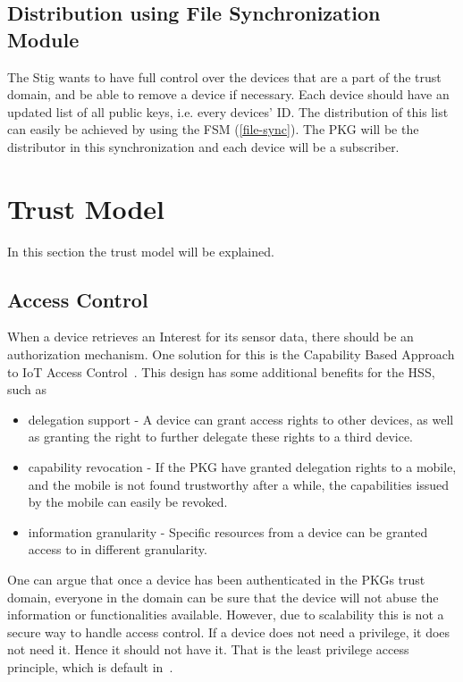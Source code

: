 
\subsection{Distribution using File Synchronization Module}

The Stig wants to have full control over the devices that are a part of the trust domain, and be able to remove a device if necessary.
Each device should have an updated list of all public keys, i.e. every devices' \gls{ID}.
The distribution of this list can easily be achieved by using the \gls{FSM} (\autoref{file-sync}).
The \gls{PKG} will be the distributor in this synchronization and each device will be a subscriber.


\section{Trust Model}
In this section the trust model will be explained. 

\subsection{Access Control}\label{access_control}

When a device retrieves an Interest for its sensor data, there should be an authorization mechanism. 
One solution for this is the Capability Based Approach to \gls{IoT} Access Control~\cite{DBLP:conf/imis/GusmeroliPR12}.
This design has some additional benefits for the \gls{HSS}, such as

\begin{itemize}
  \item delegation support - 
  A device can grant access rights to other devices, as well as granting the right to further delegate these rights to a third device.
  \item capability revocation - 
  If the \gls{PKG} have granted delegation rights to a mobile, and the mobile is not found trustworthy after a while, the capabilities issued by the mobile can easily be revoked.
  \item information granularity - 
  Specific resources from a device can be granted access to in different granularity.
\end{itemize}

One can argue that once a device has been authenticated in the \gls{PKG}s trust domain, everyone in the domain can be sure that the device will not abuse the information or functionalities available. 
However, due to scalability this is not a secure way to handle access control. 
If a device does not need a privilege, it does not need it.
Hence it should not have it. 
That is the least privilege access principle, which is default in~\cite{DBLP:conf/imis/GusmeroliPR12}.

